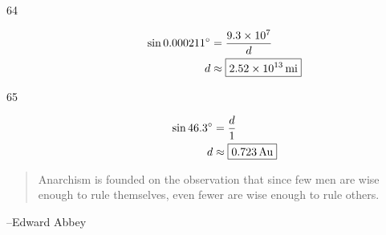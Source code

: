 \documentclass{exam}
\newcommand{\dg}{\ensuremath{^\circ}}
\begin{document}
\begin{description}
        \item[64]
          \begin{align*}
            \sin 0.000211 \dg & = \frac{9.3 \times 10^7}{d} \\
            d               & \approx \boxed{ \unit[2.52 \times 10^{13}]{mi} } \\
          \end{align*}

        \item[65]
          \begin{align*}
            \sin 46.3 \dg & = \frac{d}{1} \\
            d             & \approx \boxed{ \unit[0.723]{Au} } \\
          \end{align*}

    \end{description}

  \else
    \vspace{7 cm}
    \begin{quote}
      \begin{em}
        Anarchism is founded on the observation that since few men are wise enough to rule themselves, even fewer are
        wise enough to rule others.  
      \end{em}
    \end{quote}
    \hspace{1 cm} --Edward Abbey
  \fi
\end{document}
